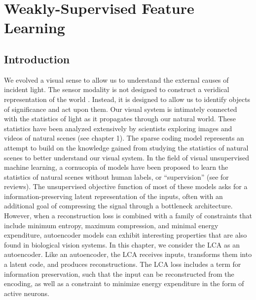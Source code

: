 

\section{Weakly-Supervised Feature Learning}\label{sec:ch3_weak_supervised_learning}
\subsection{Introduction}
We evolved a visual sense to allow us to understand the external causes of incident light.
The sensor modality is not designed to construct a veridical representation of the world \parencite{gollisch2010eye}.
Instead, it is designed to allow us to identify objects of significance and act upon them.
Our visual system is intimately connected with the statistics of light as it propagates through our natural world.
These statistics have been analyzed extensively by scientists exploring images and videos of natural scenes (see chapter 1). %
The sparse coding model represents an attempt to build on the knowledge gained from studying the statistics of natural scenes to better understand our visual system.
In the field of visual unsupervised machine learning, a cornucopia of models have been proposed to learn the statistics of natural scenes without human labels, or ``supervision'' (see \parencite{baldi2012autoencoders, bengio2012unsupervised, goodfellow2016deep} for reviews).
The unsupervised objective function of most of these models asks for a information-preserving latent representation of the inputs, often with an additional goal of compressing the signal through a bottleneck architecture.
However, when a reconstruction loss is combined with a family of constraints that include minimum entropy, maximum compression, and minimal energy expenditure, autoencoder models can exhibit interesting properties that are also found in biological vision systems.
In this chapter, we consider the LCA as an autoencoder.
Like an autoencoder, the LCA receives inputs, transforms them into a latent code, and produces reconstructions.
The LCA loss includes a term for information preservation, such that the input can be reconstructed from the encoding, as well as a constraint to minimize energy expenditure in the form of active neurons.
